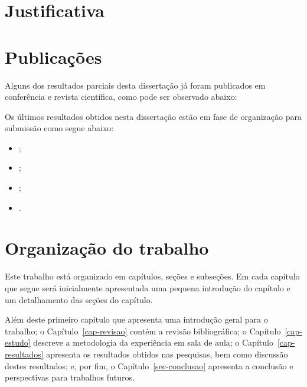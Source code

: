 \section{Justificativa}

\section{Publicações}
\label{sec-publicacoes}
Alguns dos resultados parciais desta dissertação já
foram publicados em conferência e revista científica,
como pode ser observado abaixo:
\begin{itemize}

\end{itemize}
Os últimos resultados obtidos nesta dissertação estão
em fase de organização para submissão como segue abaixo:

\begin{itemize}
\item{;}
\item{;}
\item{;}
\item{.}
\end{itemize}

\section{Organização do trabalho}
Este trabalho está organizado em capítulos, seções e subseções.
Em cada capítulo que segue será inicialmente
apresentada uma pequena introdução do capítulo e um detalhamento
das seções do capítulo.

Além deste primeiro capítulo que apresenta uma introdução geral
para o trabalho;
o Capítulo~\ref{cap-revisao} contém a revisão bibliográfica;
o Capítulo~\ref{cap-estudo} descreve a metodologia da experiência em sala de aula;
o Capítulo~\ref{cap-resultados} apresenta os resultados obtidos nas pesquisas, bem
como discussão destes resultados;
e, por fim, o Capítulo~\ref{sec-conclusao} apresenta a conclusão e perspectivas
para trabalhos futuros.
